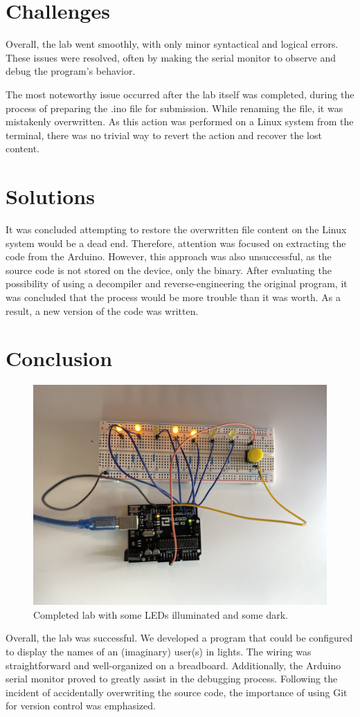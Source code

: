 \documentclass[fleqn]{article}
\begin{document}
\section{Challenges}
Overall, the lab went smoothly, with only minor syntactical and logical errors. These issues were resolved, often by making the serial monitor to observe and debug the program's behavior.

The most noteworthy issue occurred after the lab itself was completed, during the process of preparing the .ino file for submission. While renaming the file, it was mistakenly overwritten. As this action was performed on a Linux system from the terminal, there was no trivial way to revert the action and recover the lost content. 
\section{Solutions}

It was concluded attempting to restore the overwritten file content on the Linux system would be a dead end. Therefore, attention was focused on extracting the code from the Arduino. However, this approach was also unsuccessful, as the source code is not stored on the device, only the binary. After evaluating the possibility of using a decompiler and reverse-engineering the original program, it was concluded that the process would be more trouble than it was worth. As a result, a new version of the code was written.
\section{Conclusion}
    \begin{figure}[H]
        \centering
        \includegraphics[width=6in]{image.jpg}
        \caption{Completed lab with some LEDs illuminated and some dark.}
    \end{figure}
    Overall, the lab was successful. We developed a program that could be configured to display the names of an (imaginary) user(s) in lights. The wiring was straightforward and well-organized on a breadboard. Additionally, the Arduino serial monitor proved to greatly assist in the debugging process. Following the incident of accidentally overwriting the source code, the importance of using Git for version control was emphasized.
\end{document}

